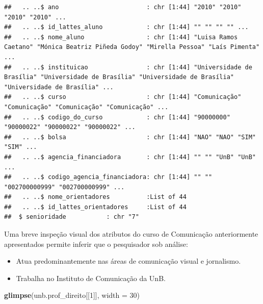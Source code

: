 \documentclass[]{article}
\newenvironment{Shaded}{\begin{snugshade}}{\end{snugshade}}
\newcommand{\KeywordTok}[1]{\textcolor[rgb]{0.13,0.29,0.53}{\textbf{#1}}}
\newcommand{\DataTypeTok}[1]{\textcolor[rgb]{0.13,0.29,0.53}{#1}}
\newcommand{\DecValTok}[1]{\textcolor[rgb]{0.00,0.00,0.81}{#1}}
\newcommand{\NormalTok}[1]{#1}
\providecommand{\tightlist}{%
  \setlength{\itemsep}{0pt}\setlength{\parskip}{0pt}}
\begin{document}
\begin{verbatim}
##   .. ..$ ano                        : chr [1:44] "2010" "2010" "2010" "2010" ...
##   .. ..$ id_lattes_aluno            : chr [1:44] "" "" "" "" ...
##   .. ..$ nome_aluno                 : chr [1:44] "Luisa Ramos Caetano" "Mónica Beatriz Piñeda Godoy" "Mirella Pessoa" "Laís Pimenta" ...
##   .. ..$ instituicao                : chr [1:44] "Universidade de Brasília" "Universidade de Brasília" "Universidade de Brasília" "Universidade de Brasília" ...
##   .. ..$ curso                      : chr [1:44] "Comunicação" "Comunicação" "Comunicação" "Comunicação" ...
##   .. ..$ codigo_do_curso            : chr [1:44] "90000000" "90000022" "90000022" "90000022" ...
##   .. ..$ bolsa                      : chr [1:44] "NAO" "NAO" "SIM" "SIM" ...
##   .. ..$ agencia_financiadora       : chr [1:44] "" "" "UnB" "UnB" ...
##   .. ..$ codigo_agencia_financiadora: chr [1:44] "" "" "002700000999" "002700000999" ...
##   .. ..$ nome_orientadores          :List of 44
##   .. ..$ id_lattes_orientadores     :List of 44
##  $ senioridade           : chr "7"
\end{verbatim}

Uma breve inspeção visual dos atributos do curso de Comunicação
anteriormente apresentados permite inferir que o pesquisador sob
análise:

\begin{itemize}
\tightlist
\item
  Atua predominantemente nas áreas de comunicação visual e jornalismo.
\item
  Trabalha no Instituto de Comunicação da UnB.
\end{itemize}

\begin{Shaded}
\begin{Highlighting}[]
\KeywordTok{glimpse}\NormalTok{(unb.prof_direito[[}\DecValTok{1}\NormalTok{]], }\DataTypeTok{width =} \DecValTok{30}\NormalTok{)}
\end{Highlighting}
\end{Shaded}
\end{document}
